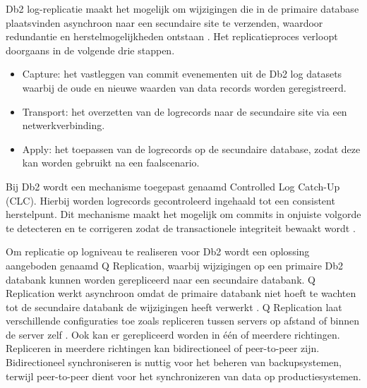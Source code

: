 Db2 log-replicatie maakt het mogelijk om wijzigingen die in de primaire database plaatsvinden asynchroon naar een secundaire site te verzenden, waardoor redundantie en herstelmogelijkheden ontstaan \autocite{ibm_2026_infosphere}.
Het replicatieproces verloopt doorgaans in de volgende drie stappen.
\begin{itemize}
    \item Capture: het vastleggen van commit evenementen uit de Db2 log datasets waarbij de oude en nieuwe waarden van data records worden geregistreerd.
    \item Transport: het overzetten van de logrecords naar de secundaire site via een netwerkverbinding. 
    \item Apply: het toepassen van de logrecords op de secundaire database, zodat deze kan worden gebruikt na een faalscenario.
\end{itemize}
Bij Db2 wordt een mechanisme toegepast genaamd Controlled Log Catch-Up (CLC).
Hierbij worden logrecords gecontroleerd ingehaald tot een consistent herstelpunt. 
Dit mechanisme maakt het mogelijk om commits in onjuiste volgorde te detecteren en te corrigeren zodat de transactionele integriteit bewaakt wordt \autocite{ibm_2026_db2}.

Om replicatie op logniveau te realiseren voor Db2 wordt een oplossing aangeboden genaamd Q Replication, waarbij wijzigingen op een primaire Db2 databank kunnen worden gerepliceerd naar een secundaire databank.
Q Replication werkt asynchroon omdat de primaire databank niet hoeft te wachten tot de secundaire databank de wijzigingen heeft verwerkt \autocite{ibm_2026_db2_q_replication}.
Q Replication laat verschillende configuraties toe zoals repliceren tussen servers op afstand of binnen de server zelf \autocite{ibm_2026_infosphere_q_replication}.
Ook kan er gerepliceerd worden in één of meerdere richtingen. Repliceren in meerdere richtingen kan bidirectioneel of peer-to-peer zijn.
Bidirectioneel synchroniseren is nuttig voor het beheren van backupsystemen, terwijl peer-to-peer dient voor het synchronizeren van data op productiesystemen.

